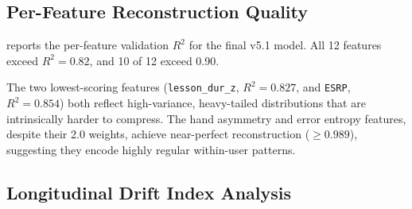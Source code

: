 \subsection{Per-Feature Reconstruction Quality}
\label{sec:perfeat}

 reports the per-feature validation $R^2$ for the final
v5.1 model.
All 12 features exceed $R^2{=}0.82$, and 10 of 12 exceed 0.90.

\begin{table}[h]
  \centering
  \caption{Per-feature validation $R^2$ for NeuroLink 3.0 v5.1.}
  \label{tab:perfeat}
\end{table}

The two lowest-scoring features (\texttt{lesson\_dur\_z}, $R^2{=}0.827$, and
\texttt{ESRP}, $R^2{=}0.854$) both reflect high-variance, heavy-tailed
distributions that are intrinsically harder to compress.
The hand asymmetry and error entropy features, despite their 2.0 weights,
achieve near-perfect reconstruction ($\geq0.989$), suggesting they encode
highly regular within-user patterns.

\subsection{Longitudinal Drift Index Analysis}
\label{sec:ldi_results}

